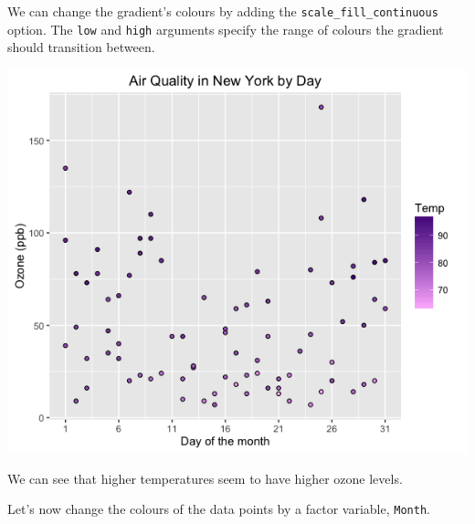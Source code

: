 We can change the gradient's colours by adding the
\texttt{scale\_fill\_continuous} option. The \texttt{low} and
\texttt{high} arguments specify the range of colours the gradient should
transition between.

\begin{Shaded}
\begin{Highlighting}[]
\StringTok{  }\StringTok{ }\NormalTok{(} \NormalTok{, } \NormalTok{)}
\end{Highlighting}
\end{Shaded}

\begin{center}\includegraphics[width=0.55\linewidth]{0_all_posts_pdf/scatter_8-1} \end{center}

We can see that higher temperatures seem to have higher ozone levels.

Let's now change the colours of the data points by a factor variable,
\texttt{Month}.

\begin{Shaded}
\begin{Highlighting}[]
\StringTok{ }\NormalTok{(}   \StringTok{ }
\StringTok{      }\NormalTok{(} \NormalTok{) +}
\StringTok{      }\NormalTok{(}\NormalTok{) +}\StringTok{ }
\StringTok{      }\NormalTok{(} \NormalTok{, } \NormalTok{) +}
\StringTok{      }\NormalTok{(} \NormalTok{(}\NormalTok{, }\NormalTok{, }\NormalTok{))}
\end{Highlighting}
\end{Shaded}

